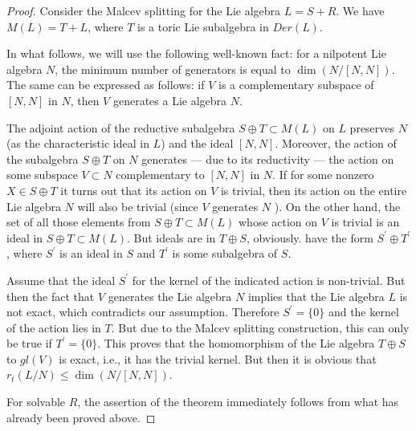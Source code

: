 \documentclass{amsart}
\begin{document}
\begin{proof}
Consider the Malcev splitting for the Lie algebra $L=S+R$. We have $M(L)=T+L$, where $T$ is a toric Lie subalgebra in $Der(L)$.

In what follows, we will use the following well-known fact: for a nilpotent Lie algebra $N$, the minimum number of generators is equal to $\dim(N/[N,N])$. The same can be expressed as follows: if $V$ is a complementary subspace of $[N,N]$ in $N$, then $V$ generates a Lie algebra $N$.

The adjoint action of the reductive subalgebra $S\oplus T \subset M(L)$ on $L$ preserves $N$ (as the characteristic ideal in $L$) and the ideal $[N,N]$. Moreover, the action of the subalgebra $S \oplus T$ on $N$ generates --- due to its reductivity --- the action on some subspace $V \subset N$ complementary to $[N,N]$ in $N$. If for some nonzero $X \in S \oplus T$ it turns out that its action on $V$ is trivial, then its action on the entire Lie algebra $N$ will also be trivial (since $V$ generates $N$ ). On the other hand, the set of all those elements from $S\oplus T \subset M(L)$ whose action on $V$ is trivial is an ideal in $S\oplus T \subset M(L)$. But ideals are in $T\oplus S$, obviously. have the form $S^\prime \oplus T^\prime$, where $S^\prime$ is an ideal in $S$ and $T^\prime$ is some subalgebra of $S$.

Assume that the ideal $S^\prime$ for the kernel of the indicated action is non-trivial. But then the fact that $V$ generates the Lie algebra $N$ implies that the Lie algebra $L$ is not exact, which contradicts our assumption. Therefore $S^\prime= \{0\}$ and the kernel of the action lies in $T$. But due to the Malcev splitting construction, this can only be true if $T^\prime = \{0\}$. This proves that the homomorphism of the Lie algebra $T \oplus S$ to $gl(V)$ is exact, i.e., it has the trivial kernel. But then it is obvious that $r_t(L/N) \le \dim (N/[N,N])$.

For solvable $R$, the assertion of the theorem immediately follows from what has already been proved above.
\end{proof}
\end{document}

